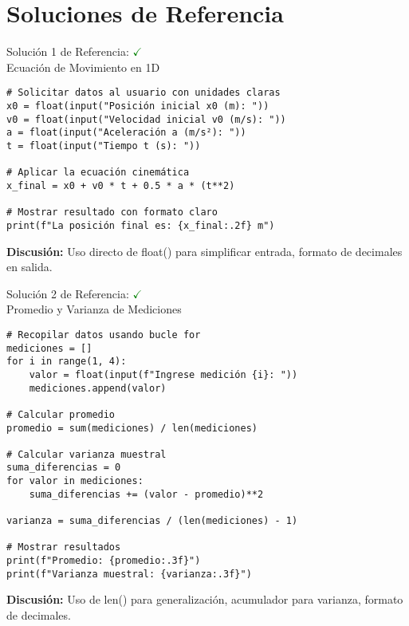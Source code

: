 \documentclass[10pt]{beamer}
\begin{document}
\section{Soluciones de Referencia}

\begin{frame}[fragile]{Solución 1 de Referencia: \hfill \textcolor{green}{$\checkmark$} \\ Ecuación de Movimiento en 1D}
\begin{verbatim}
# Solicitar datos al usuario con unidades claras
x0 = float(input("Posición inicial x0 (m): "))
v0 = float(input("Velocidad inicial v0 (m/s): "))
a = float(input("Aceleración a (m/s²): "))
t = float(input("Tiempo t (s): "))

# Aplicar la ecuación cinemática
x_final = x0 + v0 * t + 0.5 * a * (t**2)

# Mostrar resultado con formato claro
print(f"La posición final es: {x_final:.2f} m")
\end{verbatim}
\textbf{Discusión:} Uso directo de float() para simplificar entrada, formato de decimales en salida.
\end{frame}

\begin{frame}[fragile]{Solución 2 de Referencia: \hfill \textcolor{green}{$\checkmark$} \\ Promedio y Varianza de Mediciones}
\begin{verbatim}
# Recopilar datos usando bucle for
mediciones = []
for i in range(1, 4):
    valor = float(input(f"Ingrese medición {i}: "))
    mediciones.append(valor)

# Calcular promedio
promedio = sum(mediciones) / len(mediciones)

# Calcular varianza muestral
suma_diferencias = 0
for valor in mediciones:
    suma_diferencias += (valor - promedio)**2

varianza = suma_diferencias / (len(mediciones) - 1)

# Mostrar resultados
print(f"Promedio: {promedio:.3f}")
print(f"Varianza muestral: {varianza:.3f}")
\end{verbatim}
\textbf{Discusión:} Uso de len() para generalización, acumulador para varianza, formato de decimales.
\end{frame}
\end{document}
